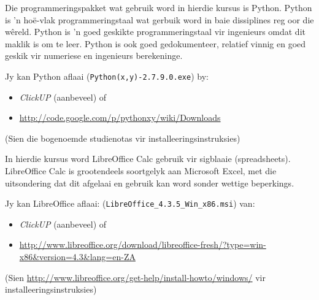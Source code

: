         Die programmeringspakket wat gebruik word in hierdie kursus is Python.
        Python is 'n ho\"{e}-vlak programmeringstaal wat gerbuik word in baie
        dissiplines reg oor die w\^{e}reld. Python is 'n goed geskikte
        programmeringstaal vir ingenieurs omdat dit maklik is om te leer.
        Python is ook goed gedokumenteer, relatief vinnig en goed geskik vir
        numeriese en ingenieurs berekeninge.

        Jy kan Python aflaai ({\tt Python(x,y)-2.7.9.0.exe}) by:
        \begin{itemize}
            \item \textit{ClickUP} (aanbeveel) of
            \item \url{http://code.google.com/p/pythonxy/wiki/Downloads}
        \end{itemize}
        (Sien die bogenoemde studienotas vir installeeringsinstruksies)

        In hierdie kursus word LibreOffice Calc gebruik vir sigblaaie
        (spreadsheets).  LibreOffice Calc is grootendeels soortgelyk aan
        Microsoft Excel, met die uitsondering dat dit afgelaai en gebruik kan
        word sonder wettige beperkings.

        Jy kan LibreOffice aflaai:
        ({\tt  LibreOffice\_4.3.5\_Win\_x86.msi}) van:
        \begin{itemize}
            \item \textit{ClickUP} (aanbeveel) of
            \item \url{http://www.libreoffice.org/download/libreoffice-fresh/?type=win-x86&version=4.3&lang=en-ZA}
        \end{itemize}
        (Sien \url{http://www.libreoffice.org/get-help/install-howto/windows/}
        vir installeeringsinstruksies)
